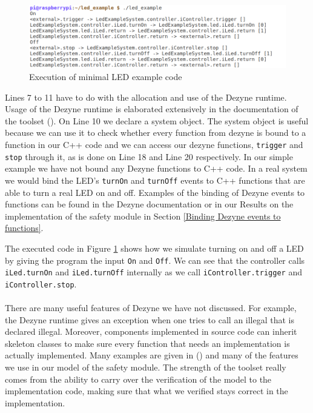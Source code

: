 \documentclass[12pt]{scrreprt}
\begin{document}
\begin{figure}[H]
    \centering
    \includegraphics[width=\textwidth]{Figures/theoretical_background/executed.png}
    \caption{Execution of minimal LED example code}
    \label{Execution of minimal led example code}
\end{figure}

Lines 7 to 11 have to do with the allocation and use of the Dezyne runtime. Usage of the Dezyne runtime is elaborated extensively in the documentation of the toolset (\cite{dzndoc}). On Line 10 we declare a system object. The system object is useful because we can use it to check whether every function from dezyne is bound to a function in our C++ code and we can access our dezyne functions, \texttt{trigger} and \texttt{stop} through it, as is done on Line 18 and Line 20 respectively. In our simple example we have not bound any Dezyne functions to C++ code. In a real system we would bind the LED's \texttt{turnOn} and \texttt{turnOff} events to C++ functions that are able to turn a real LED on and off. Examples of the binding of Dezyne events to functions can be found in the Dezyne documentation or in our Results on the implementation of the safety module in Section \ref{Binding Dezyne events to functions}. 
\par
The executed code in Figure \ref{Execution of minimal led example code} shows how we simulate turning on and off a LED by giving the program the input \texttt{On} and \texttt{Off}. We can see that the controller calls \texttt{iLed.turnOn} and \texttt{iLed.turnOff} internally as we call \texttt{iController.trigger} and \texttt{iController.stop}.
\\\\
There are many useful features of Dezyne we have not discussed. For example, the Dezyne runtime gives an exception when one tries to call an illegal that is declared illegal. Moreover, components implemented in source code can inherit skeleton classes to make sure every function that needs an implementation is actually implemented. Many examples are given in (\cite{dzntut}) and many of the features we use in our model of the safety module. The strength of the toolset really comes from the ability to carry over the verification of the model to the implementation code, making sure that what we verified stays correct in the implementation.
\end{document}
